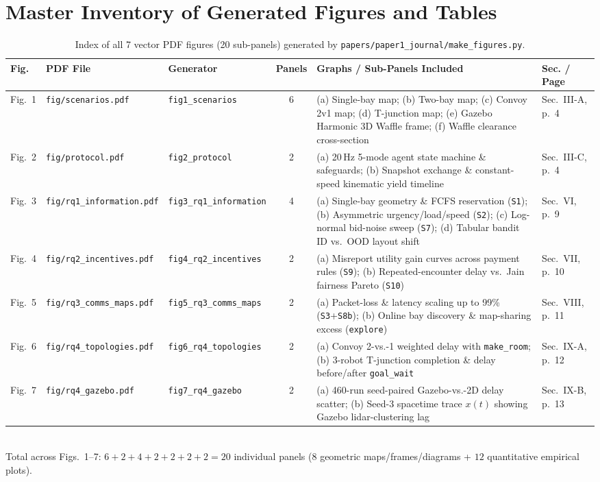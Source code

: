 \documentclass[10pt,a4paper]{article}
\begin{document}
\section{Master Inventory of Generated Figures and Tables}

\begin{table}[h!]\centering
\caption{Index of all 7 vector PDF figures (20 sub-panels) generated by \texttt{papers/paper1\_journal/make\_figures.py}.}
\footnotesize\setlength{\tabcolsep}{3.6pt}
\begin{tabularx}{\textwidth}{@{}lllc>{\raggedright\arraybackslash}Xl@{}}\toprule
\rowcolor{HdrBg}\textbf{Fig.} & \textbf{PDF File} & \textbf{Generator} & \textbf{Panels} & \textbf{Graphs / Sub-Panels Included} & \textbf{Sec. / Page} \\\midrule
Fig.~1 & \texttt{fig/scenarios.pdf} & \texttt{fig1\_scenarios} & 6 & (a) Single-bay map; (b) Two-bay map; (c) Convoy 2v1 map; (d) T-junction map; (e) Gazebo Harmonic 3D Waffle frame; (f) Waffle clearance cross-section & Sec.~III-A, p.~4 \\
Fig.~2 & \texttt{fig/protocol.pdf} & \texttt{fig2\_protocol} & 2 & (a) 20\,Hz 5-mode agent state machine \& safeguards; (b) Snapshot exchange \& constant-speed kinematic yield timeline & Sec.~III-C, p.~4 \\
Fig.~3 & \texttt{fig/rq1\_information.pdf} & \texttt{fig3\_rq1\_information} & 4 & (a) Single-bay geometry \& FCFS reservation (\texttt{S1}); (b) Asymmetric urgency/load/speed (\texttt{S2}); (c) Log-normal bid-noise sweep (\texttt{S7}); (d) Tabular bandit ID vs.\ OOD layout shift & Sec.~VI, p.~9 \\
Fig.~4 & \texttt{fig/rq2\_incentives.pdf} & \texttt{fig4\_rq2\_incentives} & 2 & (a) Misreport utility gain curves across payment rules (\texttt{S9}); (b) Repeated-encounter delay vs.\ Jain fairness Pareto (\texttt{S10}) & Sec.~VII, p.~10 \\
Fig.~5 & \texttt{fig/rq3\_comms\_maps.pdf} & \texttt{fig5\_rq3\_comms\_maps} & 2 & (a) Packet-loss \& latency scaling up to 99\% (\texttt{S3}+\texttt{S8b}); (b) Online bay discovery \& map-sharing excess (\texttt{explore}) & Sec.~VIII, p.~11 \\
Fig.~6 & \texttt{fig/rq4\_topologies.pdf} & \texttt{fig6\_rq4\_topologies} & 2 & (a) Convoy 2-vs.-1 weighted delay with \texttt{make\_room}; (b) 3-robot T-junction completion \& delay before/after \texttt{goal\_wait} & Sec.~IX-A, p.~12 \\
Fig.~7 & \texttt{fig/rq4\_gazebo.pdf} & \texttt{fig7\_rq4\_gazebo} & 2 & (a) 460-run seed-paired Gazebo-vs.-2D delay scatter; (b) Seed-3 spacetime trace $x(t)$ showing Gazebo lidar-clustering lag & Sec.~IX-B, p.~13 \\\bottomrule
\end{tabularx}
\\[2pt]{\scriptsize Total across Figs.~1--7: $6 + 2 + 4 + 2 + 2 + 2 + 2 = 20$ individual panels ($8$ geometric maps/frames/diagrams + $12$ quantitative empirical plots).}
\end{table}
\end{document}
